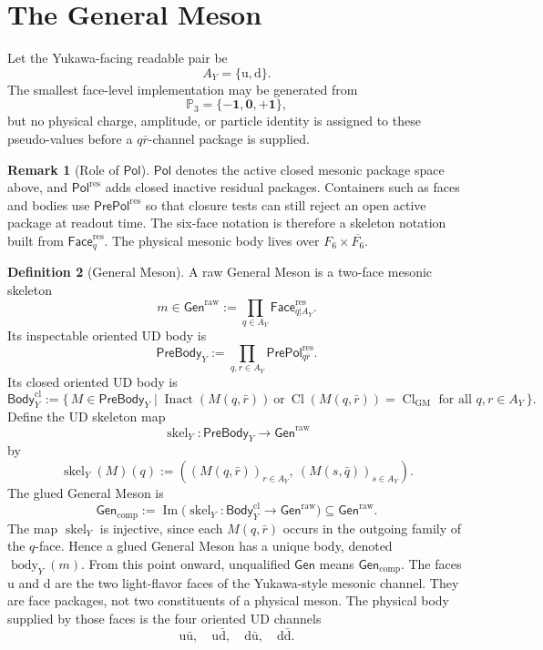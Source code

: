\documentclass[11pt]{article}
\theoremstyle{definition}
\newtheorem{definition}{Definition}
\newtheorem{remark}[definition]{Remark}
\theoremstyle{plain}
\DeclareMathOperator{\Cl}{Cl}
\DeclareMathOperator{\skel}{skel}
\DeclareMathOperator{\body}{body}
\DeclareMathOperator{\Inact}{Inact}
\newcommand{\qu}{\mathrm u}
\newcommand{\qd}{\mathrm d}
\begin{document}
\section{The General Meson}

Let the Yukawa-facing readable pair be
\[
  A_Y=\{\qu,\qd\}.
\]
The smallest face-level implementation may be generated from
\[
  \mathbb P_3=\{\mathbf{-1},\mathbf 0,\mathbf{+1}\},
\]
but no physical charge, amplitude, or particle identity is assigned to
these pseudo-values before a \(q\bar r\)-channel package is supplied.

\begin{remark}[Role of \(\mathsf{Pol}\)]
\(\mathsf{Pol}\) denotes the active closed mesonic package space above, and
\(\mathsf{Pol}^{\mathrm{res}}\) adds closed inactive residual packages.
Containers such as faces and bodies use \(\mathsf{PrePol}^{\mathrm{res}}\)
so that closure tests can still reject an open active package at readout
time.
The six-face notation is therefore a skeleton notation built from
\(\mathsf{Face}^{\mathrm{res}}_q\).  The physical mesonic body lives over
\(F_6\times\overline{F_6}\).
\end{remark}

\begin{definition}[General Meson]
A raw General Meson is a two-face mesonic skeleton
\[
  m\in
  \mathsf{Gen}^{\mathrm{raw}}
  :=
  \prod_{q\in A_Y}\mathsf{Face}^{\mathrm{res}}_{q|A_Y}.
\]
Its inspectable oriented UD body is
\[
  \mathsf{PreBody}_{Y}
  :=
  \prod_{q,r\in A_Y}\mathsf{PrePol}^{\mathrm{res}}_{q\bar r}.
\]
Its closed oriented UD body is
\[
  \mathsf{Body}_{Y}^{\mathrm{cl}}
  :=
  \{\,M\in\mathsf{PreBody}_{Y}\mid
  \Inact(M(q,\bar r))\ \text{or}\
  \Cl(M(q,\bar r))=\Cl_{\mathrm{GM}}
  \text{ for all }q,r\in A_Y\,\}.
\]
Define the UD skeleton map
\[
  \skel_Y:\mathsf{PreBody}_{Y}\longrightarrow\mathsf{Gen}^{\mathrm{raw}}
\]
by
\[
  \skel_Y(M)(q)
  :=
  \left(
    (M(q,\bar r))_{r\in A_Y},\
    (M(s,\bar q))_{s\in A_Y}
  \right).
\]
The glued General Meson is
\[
  \mathsf{Gen}_{\mathrm{comp}}
  :=
  \operatorname{Im}
  \bigl(\skel_Y:\mathsf{Body}_{Y}^{\mathrm{cl}}
  \to\mathsf{Gen}^{\mathrm{raw}}\bigr)
  \subseteq
  \mathsf{Gen}^{\mathrm{raw}}.
\]
The map \(\skel_Y\) is injective, since each \(M(q,\bar r)\) occurs in
the outgoing family of the \(q\)-face.  Hence a glued General Meson has a
unique body, denoted \(\body_Y(m)\).  From this point onward, unqualified
\(\mathsf{Gen}\) means \(\mathsf{Gen}_{\mathrm{comp}}\).
The faces \(\qu\) and \(\qd\) are the two light-flavor faces of the
Yukawa-style mesonic channel.  They are face packages, not two constituents
of a physical meson.  The physical body supplied by those faces is the four
oriented UD channels
\[
  \qu\bar{\qu},\quad \qu\bar{\qd},\quad
  \qd\bar{\qu},\quad \qd\bar{\qd}.
\]
\end{definition}
\end{document}
